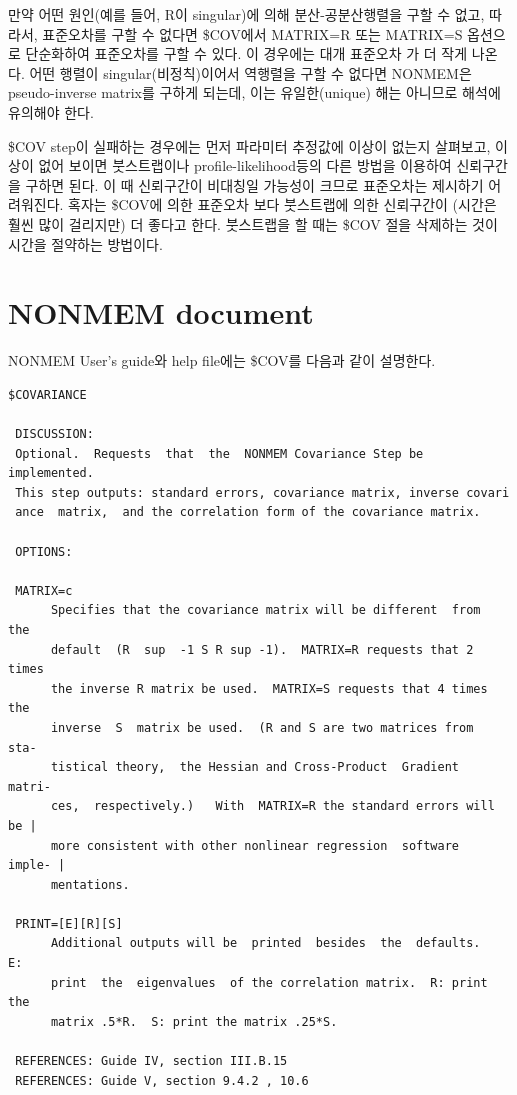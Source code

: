 \documentclass[
  10pt,
  krantz2,
  a4paper]{krantz}
\theoremstyle{definition}
\theoremstyle{definition}
\theoremstyle{definition}
\theoremstyle{remark}
\begin{document}
만약 어떤 원인(예를 들어, R이 singular)에 의해 분산-공분산행렬을 구할 수 없고, 따라서, 표준오차를 구할 수 없다면 \$COV에서 MATRIX=R 또는 MATRIX=S 옵션으로 단순화하여 표준오차를 구할 수 있다. 이 경우에는 대개 표준오차 가 더 작게 나온다. 어떤 행렬이 singular(비정칙)이어서 역행렬을 구할 수 없다면 NONMEM은 pseudo-inverse matrix를 구하게 되는데, 이는 유일한(unique) 해는 아니므로 해석에 유의해야 한다.

\$COV step이 실패하는 경우에는 먼저 파라미터 추정값에 이상이 없는지 살펴보고, 이상이 없어 보이면 붓스트랩이나 profile-likelihood등의 다른 방법을 이용하여 신뢰구간을 구하면 된다. 이 때 신뢰구간이 비대칭일 가능성이 크므로 표준오차는 제시하기 어려워진다. 혹자는 \$COV에 의한 표준오차 보다 붓스트랩에 의한 신뢰구간이 (시간은 훨씬 많이 걸리지만) 더 좋다고 한다. 붓스트랩을 할 때는 \$COV 절을 삭제하는 것이 시간을 절약하는 방법이다.

\hypertarget{nonmem-document}{%
\section{NONMEM document}\label{nonmem-document}}

NONMEM User's guide와 help file에는 \$COV를 다음과 같이 설명한다.

\begin{verbatim}
$COVARIANCE

 DISCUSSION:
 Optional.  Requests  that  the  NONMEM Covariance Step be implemented.
 This step outputs: standard errors, covariance matrix, inverse covari
 ance  matrix,  and the correlation form of the covariance matrix.

 OPTIONS:

 MATRIX=c
      Specifies that the covariance matrix will be different  from  the
      default  (R  sup  -1 S R sup -1).  MATRIX=R requests that 2 times
      the inverse R matrix be used.  MATRIX=S requests that 4 times the
      inverse  S  matrix be used.  (R and S are two matrices from  sta-
      tistical theory,  the Hessian and Cross-Product  Gradient  matri-
      ces,  respectively.)   With  MATRIX=R the standard errors will be |
      more consistent with other nonlinear regression  software  imple- |
      mentations.

 PRINT=[E][R][S]
      Additional outputs will be  printed  besides  the  defaults.   E:
      print  the  eigenvalues  of the correlation matrix.  R: print the
      matrix .5*R.  S: print the matrix .25*S.

 REFERENCES: Guide IV, section III.B.15
 REFERENCES: Guide V, section 9.4.2 , 10.6
\end{verbatim}
\end{document}
